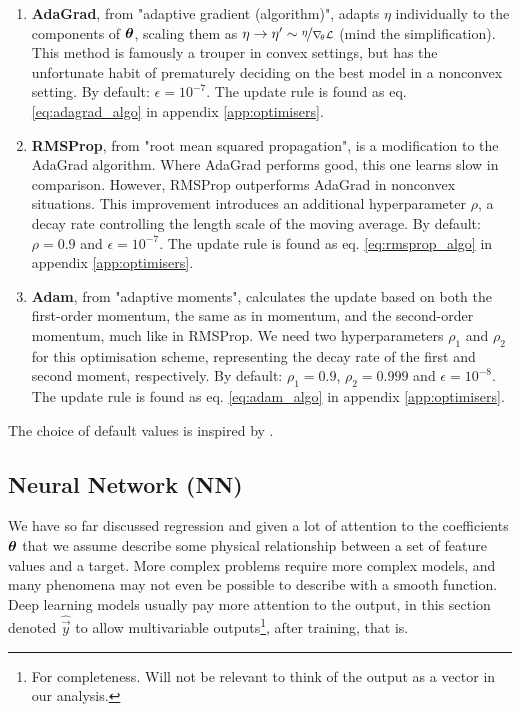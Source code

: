     \begin{enumerate}[leftmargin=0pt,labelwidth=!,labelsep=.05em]
        \item[]\textbf{AdaGrad}, from "adaptive gradient (algorithm)", adapts $\eta$ individually to the components of $\boldsymbol{\theta}$, scaling them as $\eta \to \eta' \sim \nicefrac{\eta}{\nabla_{\! \theta} \mathcal{L}}$ (mind the simplification). This method is famously a trouper in convex settings, but has the unfortunate habit of prematurely deciding on the best model in a nonconvex setting. By default: $\epsilon=10^{-7}$. The update rule is found as eq. \eqref{eq:adagrad_algo} \citep[algorithm 8.4]{Goodfellow2016} in appendix \ref{app:optimisers}.
        \item[]\textbf{RMSProp}, from "root mean squared propagation", is a modification to the AdaGrad algorithm. Where AdaGrad performs good, this one learns slow in comparison. However, RMSProp outperforms AdaGrad in nonconvex situations. This improvement introduces an additional hyperparameter $\rho$, a decay rate controlling the length scale of the moving average. By default: $\rho = 0.9$ and $\epsilon=10^{-7}$. The update rule is found as eq. \eqref{eq:rmsprop_algo} \citep[algorithm 8.5]{Goodfellow2016} in appendix \ref{app:optimisers}.
        \item[]\textbf{Adam}, from "adaptive moments", calculates the update based on both the first-order momentum, the same as in momentum, and the second-order momentum, much like in RMSProp. We need two hyperparameters $\rho_1$ and $\rho_2$ for this optimisation scheme, representing the decay rate of the first and second moment, respectively. By default: $\rho_1 = 0.9$, $\rho_2=0.999$ and $\epsilon=10^{-8}$. The update rule is found as eq. \eqref{eq:adam_algo} \citep[algorithm 8.7]{Goodfellow2016} in appendix \ref{app:optimisers}. 
    \end{enumerate}
    
The choice of default values is inspired by \citep[chapter 8.5]{Goodfellow2016}. 

    
    
\subsection{Neural Network (NN)}\label{sec:neural_network}

We have so far discussed regression and given a lot of attention to the coefficients $\boldsymbol{\theta}$ that we assume describe some physical relationship between a set of feature values and a target. More complex problems require more complex models, and many phenomena may not even be possible to describe with a smooth function. Deep learning models usually pay more attention to the output, in this section denoted $\hat{\vec{y}}$ to allow multivariable outputs\footnote{For completeness. Will not be relevant to think of the output as a vector in our analysis.}, after training, that is. 

